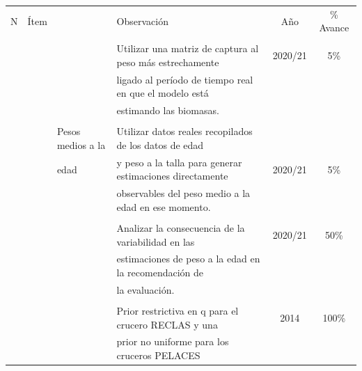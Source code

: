 \documentclass[
  spanish,
]{article}
\begin{document}
\begin{table}[h]
  \centering
  \resizebox{16cm}{!} {
  \begin{tabular}{|c|l|l|l|c|c|}
  \hline
  N  &  Ítem           &                      &   Observación                                         & Año    &    \% Avance \\ 
     &               &                      &                                                       &        & \\ \hline    
     &               &                      & Utilizar una matriz de captura al peso más estrechamente& 2020/21 & 5\% \\
     &               &                      & ligado al período de tiempo real en que el modelo está &       & \\
     &               &                      & estimando las biomasas.                                &       & \\ 
     &               &                      &                                                        &       & \\
     &               & Pesos medios a la    & Utilizar datos reales recopilados de los datos de edad &       & \\
     &               & edad                 & y peso a la talla para generar estimaciones directamente& 2020/21 & 5\% \\
     &               &                      & observables del peso medio a la edad en ese momento.   &       & \\
     &               &                      &                                                        &       & \\
     &               &                      & Analizar la consecuencia de la variabilidad en las     & 2020/21 & 50\% \\
     &               &                      & estimaciones de peso a la edad en la recomendación de  &       & \\
     &               &                      & la evaluación.                                         &       & \\ \hline
     &               &                      &                                                        &       & \\
     &               &                      & Prior restrictiva en q para el crucero RECLAS y una    & 2014  & 100\% \\
     &               &                      & prior no uniforme para los cruceros PELACES            &       & \\

\end{tabular}}
\end{table}
\end{document}
